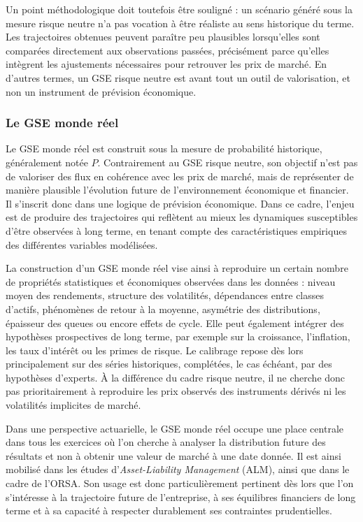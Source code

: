 Un point méthodologique doit toutefois être souligné : un scénario généré sous la mesure risque neutre n'a pas vocation à être réaliste au sens historique du terme. Les trajectoires obtenues peuvent paraître peu plausibles lorsqu'elles sont comparées directement aux observations passées, précisément parce qu'elles intègrent les ajustements nécessaires pour retrouver les prix de marché. En d'autres termes, un GSE risque neutre est avant tout un outil de valorisation, et non un instrument de prévision économique.

\subsubsection{Le GSE monde réel}

Le GSE monde réel est construit sous la mesure de probabilité historique, généralement notée $P$. Contrairement au GSE risque neutre, son objectif n'est pas de valoriser des flux en cohérence avec les prix de marché, mais de représenter de manière plausible l'évolution future de l'environnement économique et financier. Il s'inscrit donc dans une logique de prévision économique. Dans ce cadre, l'enjeu est de produire des trajectoires qui reflètent au mieux les dynamiques susceptibles d'être observées à long terme, en tenant compte des caractéristiques empiriques des différentes variables modélisées.

La construction d'un GSE monde réel vise ainsi à reproduire un certain nombre de propriétés statistiques et économiques observées dans les données : niveau moyen des rendements, structure des volatilités, dépendances entre classes d'actifs, phénomènes de retour à la moyenne, asymétrie des distributions, épaisseur des queues ou encore effets de cycle. Elle peut également intégrer des hypothèses prospectives de long terme, par exemple sur la croissance, l'inflation, les taux d'intérêt ou les primes de risque. Le calibrage repose dès lors principalement sur des séries historiques, complétées, le cas échéant, par des hypothèses d'experts. À la différence du cadre risque neutre, il ne cherche donc pas prioritairement à reproduire les prix observés des instruments dérivés ni les volatilités implicites de marché.

Dans une perspective actuarielle, le GSE monde réel occupe une place centrale dans tous les exercices où l'on cherche à analyser la distribution future des résultats et non à obtenir une valeur de marché à une date donnée. Il est ainsi mobilisé dans les études d'\textit{Asset-Liability Management} (ALM), ainsi que dans le cadre de l'ORSA. Son usage est donc particulièrement pertinent dès lors que l'on s'intéresse à la trajectoire future de l'entreprise, à ses équilibres financiers de long terme et à sa capacité à respecter durablement ses contraintes prudentielles.

